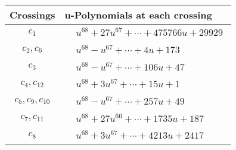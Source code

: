 \documentclass[1p]{elsarticle_modified}
\theoremstyle{definition}
\begin{document}
\begin{tabular}{m{50pt}|m{274pt}}
Crossings & \hspace{64pt}u-Polynomials at each crossing \\
\hline $$\begin{aligned}c_{1}\end{aligned}$$&$\begin{aligned}
&u^{68}+27 u^{67}+\cdots+475766 u+29929
\end{aligned}$\\
\hline $$\begin{aligned}c_{2},c_{6}\end{aligned}$$&$\begin{aligned}
&u^{68}- u^{67}+\cdots+4 u+173
\end{aligned}$\\
\hline $$\begin{aligned}c_{3}\end{aligned}$$&$\begin{aligned}
&u^{68}- u^{67}+\cdots+106 u+47
\end{aligned}$\\
\hline $$\begin{aligned}c_{4},c_{12}\end{aligned}$$&$\begin{aligned}
&u^{68}+3 u^{67}+\cdots+15 u+1
\end{aligned}$\\
\hline $$\begin{aligned}c_{5},c_{9},c_{10}\end{aligned}$$&$\begin{aligned}
&u^{68}- u^{67}+\cdots+257 u+49
\end{aligned}$\\
\hline $$\begin{aligned}c_{7},c_{11}\end{aligned}$$&$\begin{aligned}
&u^{68}+27 u^{66}+\cdots+1735 u+187
\end{aligned}$\\
\hline $$\begin{aligned}c_{8}\end{aligned}$$&$\begin{aligned}
&u^{68}+3 u^{67}+\cdots+4213 u+2417
\end{aligned}$\\
\hline
\end{tabular}\\~\\
\newpage\renewcommand{\arraystretch}{1}
\end{document}
